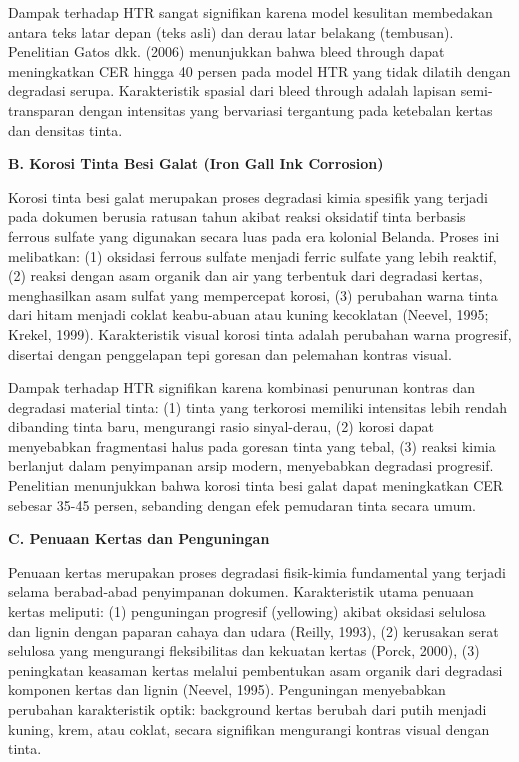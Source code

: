 \documentclass[12pt,a4paper]{article}
\begin{document}
Dampak terhadap HTR sangat signifikan karena model kesulitan membedakan antara teks latar depan (teks asli) dan derau latar belakang (tembusan). Penelitian Gatos dkk. (2006) menunjukkan bahwa bleed through dapat meningkatkan CER hingga 40 persen pada model HTR yang tidak dilatih dengan degradasi serupa. Karakteristik spasial dari bleed through adalah lapisan semi-transparan dengan intensitas yang bervariasi tergantung pada ketebalan kertas dan densitas tinta.

\vspace{0.5ex}
\noindent\textbf{B. Korosi Tinta Besi Galat (Iron Gall Ink Corrosion)}

Korosi tinta besi galat merupakan proses degradasi kimia spesifik yang terjadi pada dokumen berusia ratusan tahun akibat reaksi oksidatif tinta berbasis ferrous sulfate yang digunakan secara luas pada era kolonial Belanda. Proses ini melibatkan: (1) oksidasi ferrous sulfate menjadi ferric sulfate yang lebih reaktif, (2) reaksi dengan asam organik dan air yang terbentuk dari degradasi kertas, menghasilkan asam sulfat yang mempercepat korosi, (3) perubahan warna tinta dari hitam menjadi coklat keabu-abuan atau kuning kecoklatan (Neevel, 1995; Krekel, 1999). Karakteristik visual korosi tinta adalah perubahan warna progresif, disertai dengan penggelapan tepi goresan dan pelemahan kontras visual.

Dampak terhadap HTR signifikan karena kombinasi penurunan kontras dan degradasi material tinta: (1) tinta yang terkorosi memiliki intensitas lebih rendah dibanding tinta baru, mengurangi rasio sinyal-derau, (2) korosi dapat menyebabkan fragmentasi halus pada goresan tinta yang tebal, (3) reaksi kimia berlanjut dalam penyimpanan arsip modern, menyebabkan degradasi progresif. Penelitian menunjukkan bahwa korosi tinta besi galat dapat meningkatkan CER sebesar 35-45 persen, sebanding dengan efek pemudaran tinta secara umum.

\vspace{0.5ex}
\noindent\textbf{C. Penuaan Kertas dan Penguningan}

Penuaan kertas merupakan proses degradasi fisik-kimia fundamental yang terjadi selama berabad-abad penyimpanan dokumen. Karakteristik utama penuaan kertas meliputi: (1) penguningan progresif (yellowing) akibat oksidasi selulosa dan lignin dengan paparan cahaya dan udara (Reilly, 1993), (2) kerusakan serat selulosa yang mengurangi fleksibilitas dan kekuatan kertas (Porck, 2000), (3) peningkatan keasaman kertas melalui pembentukan asam organik dari degradasi komponen kertas dan lignin (Neevel, 1995). Penguningan menyebabkan perubahan karakteristik optik: background kertas berubah dari putih menjadi kuning, krem, atau coklat, secara signifikan mengurangi kontras visual dengan tinta.
\end{document}
